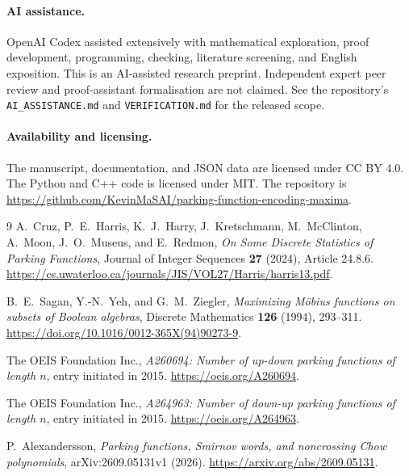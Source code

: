 \documentclass[11pt]{article}
\theoremstyle{definition}
\begin{document}
\paragraph{AI assistance.}
OpenAI Codex assisted extensively with mathematical exploration,
proof development, programming, checking, literature screening,
and English exposition. This is an AI-assisted research preprint.
Independent expert peer review and proof-assistant formalisation
are not claimed. See the repository's \texttt{AI\_ASSISTANCE.md}
and \texttt{VERIFICATION.md} for the released scope.

\paragraph{Availability and licensing.}
The manuscript, documentation, and JSON data are licensed under
CC BY 4.0. The Python and C++ code is licensed under MIT.
The repository is
\url{https://github.com/KevinMaSAI/parking-function-encoding-maxima}.

\begin{thebibliography}{9}
A.~Cruz, P.~E.~Harris, K.~J.~Harry, J.~Kretschmann,
M.~McClinton, A.~Moon, J.~O.~Museus, and E.~Redmon,
\emph{On Some Discrete Statistics of Parking Functions},
Journal of Integer Sequences \textbf{27} (2024), Article 24.8.6.
\url{https://cs.uwaterloo.ca/journals/JIS/VOL27/Harris/harris13.pdf}.

B.~E.~Sagan, Y.-N.~Yeh, and G.~M.~Ziegler,
\emph{Maximizing M\"obius functions on subsets of Boolean algebras},
Discrete Mathematics \textbf{126} (1994), 293--311.
\url{https://doi.org/10.1016/0012-365X(94)90273-9}.

The OEIS Foundation Inc.,
\emph{A260694: Number of up-down parking functions of length $n$},
entry initiated in 2015.
\url{https://oeis.org/A260694}.

The OEIS Foundation Inc.,
\emph{A264963: Number of down-up parking functions of length $n$},
entry initiated in 2015.
\url{https://oeis.org/A264963}.

P.~Alexandersson,
\emph{Parking functions, Smirnov words, and noncrossing Chow polynomials},
arXiv:2609.05131v1 (2026).
\url{https://arxiv.org/abs/2609.05131}.
\end{thebibliography}
\end{document}
